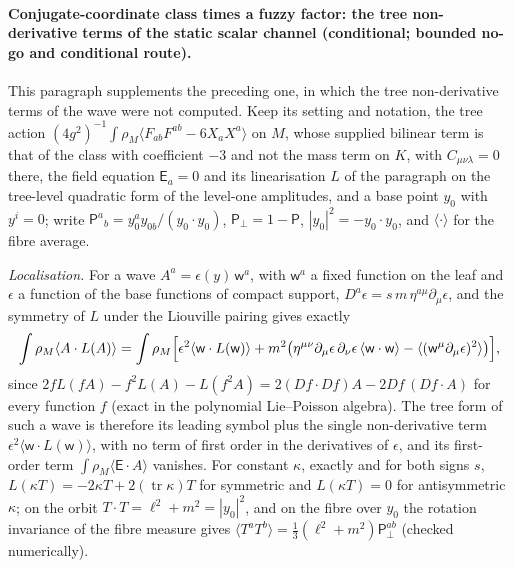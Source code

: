 \paragraph{Conjugate-coordinate class times a fuzzy factor: the tree non-derivative terms of the static scalar channel (conditional; bounded no-go and conditional route).}
This paragraph supplements the preceding one, in which the tree non-derivative terms of the wave were not computed. Keep its setting and notation, the tree action \((4g^2)^{-1}\int\rho_M\langle F_{ab}F^{ab}-6X_aX^a\rangle\) on \(M\), whose supplied bilinear term is that of the class with coefficient \(-3\) and not the mass term on \(K\), with \(C_{\mu\nu\lambda}=0\) there, the field equation \(\mathsf E_a=0\) and its linearisation \(L\) of the paragraph on the tree-level quadratic form of the level-one amplitudes, and a base point \(y_0\) with \(y^i=0\); write \(\mathsf P^a{}_b=y_0^ay_{0b}/(y_0\cdot y_0)\), \(\mathsf P_\perp=1-\mathsf P\), \(|y_0|^2=-y_0\cdot y_0\), and \(\langle\cdot\rangle\) for the fibre average.

\emph{Localisation.} For a wave \(A^a=\epsilon(y)\,\mathsf w^a\), with \(\mathsf w^a\) a fixed function on the leaf and \(\epsilon\) a function of the base functions of compact support, \(D^a\epsilon=s\,m\,\eta^{a\mu}\partial_\mu\epsilon\), and the symmetry of \(L\) under the Liouville pairing gives exactly
\[
\int\rho_M\langle A\cdot L(A)\rangle=\int\rho_M\Bigl[\epsilon^2\langle\mathsf w\cdot L(\mathsf w)\rangle+m^2\bigl(\eta^{\mu\nu}\partial_\mu\epsilon\,\partial_\nu\epsilon\,\langle\mathsf w\cdot\mathsf w\rangle-\langle(\mathsf w^\mu\partial_\mu\epsilon)^2\rangle\bigr)\Bigr],
\]
since \(2fL(fA)-f^2L(A)-L(f^2A)=2(Df\cdot Df)A-2Df\,(Df\cdot A)\) for every function \(f\) (exact in the polynomial Lie--Poisson algebra). The tree form of such a wave is therefore its leading symbol plus the single non-derivative term \(\epsilon^2\langle\mathsf w\cdot L(\mathsf w)\rangle\), with no term of first order in the derivatives of \(\epsilon\), and its first-order term \(\int\rho_M\langle\mathsf E\cdot A\rangle\) vanishes. For constant \(\kappa\), exactly and for both signs \(s\), \(L(\kappa T)=-2\kappa T+2(\operatorname{tr}\kappa)T\) for symmetric and \(L(\kappa T)=0\) for antisymmetric \(\kappa\); on the orbit \(T\cdot T=\ell^2+m^2=|y_0|^2\), and on the fibre over \(y_0\) the rotation invariance of the fibre measure gives \(\langle T^aT^b\rangle=\tfrac13(\ell^2+m^2)\mathsf P_\perp^{ab}\) (checked numerically).

